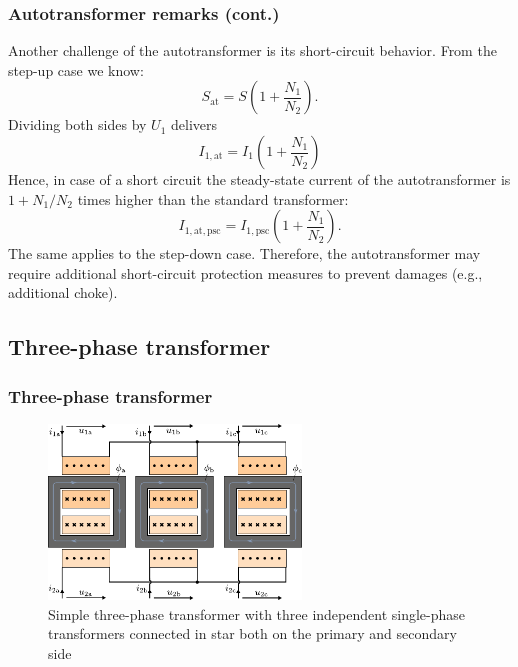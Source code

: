 \begin{frame}
	\frametitle{Autotransformer remarks (cont.)}
	Another challenge of the autotransformer is its short-circuit behavior. From the step-up case we know:
	$$ S_\mathrm{at} = S(1+\frac{N_1}{N_2}).$$ 
	\pause
	Dividing both sides by $U_1$ delivers
	\begin{equation}
		I_{1,\mathrm{at}} = I_{1}(1+\frac{N_1}{N_2})
	\end{equation}
	\pause
	Hence, in case of a short circuit the steady-state current of the autotransformer is $1+N_1/N_2$ times higher than the standard transformer:
	\begin{equation}
		I_{1,\mathrm{at,psc}} = I_{1,\mathrm{psc}}(1+\frac{N_1}{N_2}).
	\end{equation}
	\pause
	The same applies to the step-down case. Therefore, the autotransformer may require additional short-circuit protection measures to prevent damages (e.g., additional choke).
\end{frame}

\subsection{Three-phase transformer}

\begin{frame}
	\frametitle{Three-phase transformer}
	\begin{figure}
		\includegraphics[width=0.6\textwidth]{fig/lec04/Three_phase_transformer_simple.pdf}
		\caption{Simple three-phase transformer with three independent single-phase transformers connected in star both on the primary and secondary side}
		\label{fig:Three_phase_transformer_simple}
	\end{figure}
\end{frame}

